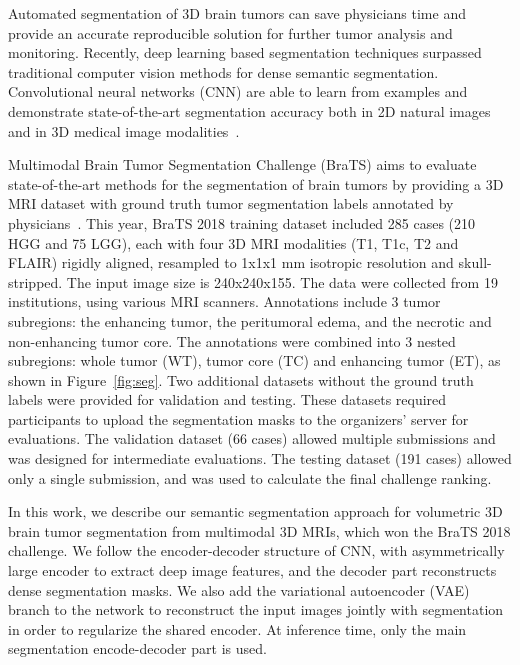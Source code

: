 \documentclass[runningheads]{llncs}
\begin{document}
Automated segmentation of 3D brain tumors can save physicians time and provide an accurate reproducible solution for further tumor analysis and monitoring. Recently, deep learning based segmentation techniques surpassed traditional computer vision methods for dense semantic segmentation. Convolutional neural networks (CNN)  are able to learn from examples and demonstrate state-of-the-art segmentation accuracy both in 2D natural images~\cite{deeplabv3plus2018} and in 3D medical image modalities~\cite{Milletari16}. 

Multimodal Brain Tumor Segmentation Challenge (BraTS) aims to evaluate state-of-the-art methods for the segmentation of brain tumors by providing a 3D MRI dataset with ground truth tumor segmentation labels annotated by physicians~\cite{BratsAll2018,brats1,brats2,brats3,brats4}. This year, BraTS 2018 training dataset included 285 cases (210 HGG and 75 LGG), each with four 3D MRI modalities (T1, T1c, T2 and FLAIR) rigidly aligned, resampled to 1x1x1 mm isotropic resolution and skull-stripped. The input image size is 240x240x155. The data were collected from 19 institutions, using various MRI scanners. Annotations include 3 tumor subregions: the enhancing tumor, the peritumoral edema, and the necrotic and non-enhancing tumor core.  The annotations were combined into 3 nested subregions: whole tumor (WT), tumor core (TC) and enhancing tumor (ET), as shown in Figure~\ref{fig:seg}. Two additional datasets without the ground truth labels were provided for validation and testing. These datasets required participants to upload the segmentation masks to the organizers' server for evaluations. The validation dataset (66 cases) allowed multiple submissions and was designed for intermediate evaluations. The testing dataset (191 cases) allowed only a single submission, and was used to calculate the final challenge ranking.  

In this work, we describe our semantic segmentation approach for volumetric 3D brain tumor segmentation from multimodal 3D MRIs, which won the BraTS 2018 challenge. We follow the encoder-decoder structure of CNN, with asymmetrically large encoder to extract deep image features, and the decoder part reconstructs dense segmentation masks. We also add the variational autoencoder (VAE) branch to the network to reconstruct the input images jointly with segmentation in order to regularize the shared encoder. At inference time, only the main segmentation encode-decoder part is used.  
\end{document}
